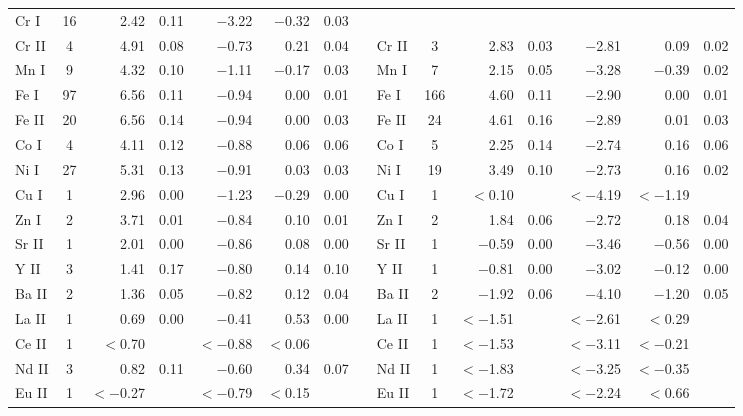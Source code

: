\documentclass{emulateapj}
\begin{document}
\begin{longtable*}{lcrcrrcclcrcrrc}
  Cr \textsc{I} &  16 &    2.42 &    0.11 & $-$3.22 & $-$0.32 &    0.03 \\
 Cr \textsc{II} &   4 &    4.91 &    0.08 & $-$0.73 &    0.21 &    0.04 &&
 Cr \textsc{II} &   3 &    2.83 &    0.03 & $-$2.81 &    0.09 &    0.02 \\
  Mn \textsc{I} &   9 &    4.32 &    0.10 & $-$1.11 & $-$0.17 &    0.03 &&
  Mn \textsc{I} &   7 &    2.15 &    0.05 & $-$3.28 & $-$0.39 &    0.02 \\
  Fe \textsc{I} &  97 &    6.56 &    0.11 & $-$0.94 &    0.00 &    0.01 &&
  Fe \textsc{I} & 166 &    4.60 &    0.11 & $-$2.90 &    0.00 &    0.01 \\
 Fe \textsc{II} &  20 &    6.56 &    0.14 & $-$0.94 &    0.00 &    0.03 &&
 Fe \textsc{II} &  24 &    4.61 &    0.16 & $-$2.89 &    0.01 &    0.03 \\
  Co \textsc{I} &   4 &    4.11 &    0.12 & $-$0.88 &    0.06 &    0.06 &&
  Co \textsc{I} &   5 &    2.25 &    0.14 & $-$2.74 &    0.16 &    0.06 \\
  Ni \textsc{I} &  27 &    5.31 &    0.13 & $-$0.91 &    0.03 &    0.03 &&
  Ni \textsc{I} &  19 &    3.49 &    0.10 & $-$2.73 &    0.16 &    0.02 \\
  Cu \textsc{I} &   1 &    2.96 &    0.00 & $-$1.23 & $-$0.29 &    0.00 &&
  Cu \textsc{I} &   1 & $<$0.10 &         &$<-$4.19 &$<-$1.19 &         \\
  Zn \textsc{I} &   2 &    3.71 &    0.01 & $-$0.84 &    0.10 &    0.01 &&
  Zn \textsc{I} &   2 &    1.84 &    0.06 & $-$2.72 &    0.18 &    0.04 \\
 Sr \textsc{II} &   1 &    2.01 &    0.00 & $-$0.86 &    0.08 &    0.00 &&
 Sr \textsc{II} &   1 & $-$0.59 &    0.00 & $-$3.46 & $-$0.56 &    0.00 \\
  Y \textsc{II} &   3 &    1.41 &    0.17 & $-$0.80 &    0.14 &    0.10 &&
  Y \textsc{II} &   1 & $-$0.81 &    0.00 & $-$3.02 & $-$0.12 &    0.00 \\
 Ba \textsc{II} &   2 &    1.36 &    0.05 & $-$0.82 &    0.12 &    0.04 &&
 Ba \textsc{II} &   2 & $-$1.92 &    0.06 & $-$4.10 & $-$1.20 &    0.05 \\
 La \textsc{II} &   1 &    0.69 &    0.00 & $-$0.41 &    0.53 &    0.00 &&
 La \textsc{II} &   1 &$<-$1.51 &         &$<-$2.61 & $<$0.29 &         \\
 Ce \textsc{II} &   1 & $<$0.70 &         &$<-$0.88 & $<$0.06 &         &&
 Ce \textsc{II} &   1 &$<-$1.53 &         &$<-$3.11 &$<-$0.21 &         \\
 Nd \textsc{II} &   3 &    0.82 &    0.11 & $-$0.60 &    0.34 &    0.07 &&
 Nd \textsc{II} &   1 &$<-$1.83 &         &$<-$3.25 &$<-$0.35 &         \\
 Eu \textsc{II} &   1 &$<-$0.27 &         &$<-$0.79 & $<$0.15 &         &&
 Eu \textsc{II} &   1 &$<-$1.72 &         &$<-$2.24 & $<$0.66 &         \\



\end{longtable*}
\end{document}
